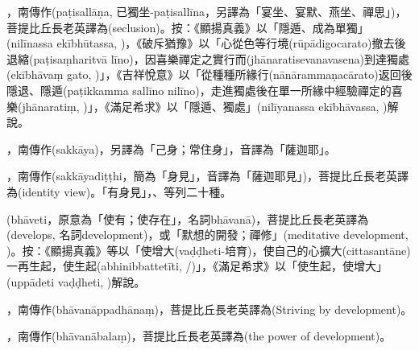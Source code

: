 \startitemgroup[noteitems]
\item{}，南傳作(paṭisallāṇa, 已獨坐-paṭisallīna，另譯為「宴坐、宴默、燕坐、禪思」)，菩提比丘長老英譯為(seclusion)。按：《顯揚真義》以「隱遁、成為單獨」(nilīnassa ekībhūtassa, )，《破斥猶豫》以「心從色等行境(rūpādigocarato)撤去後退縮(paṭisaṃharitvā līno)，因喜樂禪定之實行而(jhānaratisevanavasena)到達獨處(ekībhāvaṃ gato, )」，《吉祥悅意》以「從種種所緣行(nānārammaṇacārato)返回後隱退、隱遁(paṭikkamma sallīno nilīno)，走進獨處後在單一所緣中經驗禪定的喜樂(jhānaratiṃ, )」，《滿足希求》以「隱遁、獨處」(nilīyanassa ekībhāvassa, )解說。
\stopitemgroup

\startitemgroup[noteitems]
\item{}，南傳作(sakkāya)，另譯為「己身；常住身」，音譯為「薩迦耶」。
\item{}，南傳作(sakkāyadiṭṭhi，簡為「身見」，音譯為「薩迦耶見」)，菩提比丘長老英譯為(identity view)。「有身見」，、等列二十種。
\stopitemgroup

\startitemgroup[noteitems]
\item{}(bhāveti，原意為「使有；使存在」，名詞bhāvanā)，菩提比丘長老英譯為(develops, 名詞development)，或「默想的開發；禪修」(meditative development, )。按：《顯揚真義》等以「使增大(vaḍḍheti-培育)，使自己的心擴大(cittasantāne)一再生起，使生起(abhinibbattetīti, /)」，《滿足希求》以「使生起，使增大」(uppādeti vaḍḍheti, )解說。
\item{}，南傳作(bhāvanāppadhānaṃ)，菩提比丘長老英譯為(Striving by development)。
\item{}，南傳作(bhāvanābalaṃ)，菩提比丘長老英譯為(the power of development)。
\stopitemgroup

